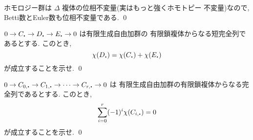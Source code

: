 \documentclass[12pt,twoside]{jarticle}
\begin{document}
\begin{guide}
ホモロジー群は $\Delta$ 複体の位相不変量(実はもっと強くホモトピー
不変量)なので, Betti数とEuler数も位相不変量である. \qed
\end{guide}


\begin{question}
  $0\to C_\bcdot \to D_\bcdot \to E_\bcdot \to 0$ は有限生成自由加群の
  有限鎖複体からなる短完全列であるとする. このとき,
  \[
    \chi(D_\bcdot) = \chi(C_\bcdot) + \chi(E_\bcdot)
  \]
  が成立することを示せ. \qed
\end{question}

\begin{question}
  $0\to C_{0,\bcdot}\to C_{1,\bcdot}\to\dots\to C_{r,\bcdot}\to 0$ は
  有限生成自由加群の有限鎖複体からなる完全列であるとする. このとき,
  \[
    \sum_{i=0}^r (-1)^i \chi(C_{i,\bcdot}) = 0
  \]
  が成立することを示せ. \qed
\end{question}

\end{document}
